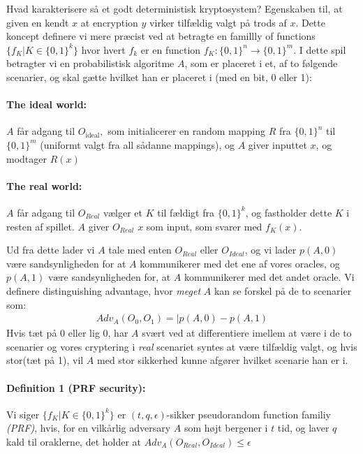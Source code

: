 \documentclass[paper=a4, fontsize=11pt]{scrartcl} %
\numberwithin{equation}{section} %
\numberwithin{figure}{section} %
\numberwithin{table}{section} %
\begin{document}
	Hvad karakterisere så et godt deterministisk kryptosystem? Egenskaben til, at given en kendt $x$ at encryption $y$ virker tilfældig valgt på trods af $x$. Dette koncept definere vi mere præcist ved at betragte en famillly of functions $\{f_K|K\in\{0,1\}^k\}$ hvor hvert $f_k$ er en function $f_K:\{0,1\}^n \rightarrow \{0,1\}^m$. I dette spil betragter vi en probabilistisk algoritme $A$, som er placeret i et, af to følgende scenarier, og skal gætte hvilket han er placeret i (med en bit, 0 eller 1):
	
	\paragraph{\textbf{The ideal world:}} $A$ får adgang til $O_{\text{ideal}},$ som initialicerer en random mapping $R$ fra $\{0,1\}^n$ til $\{0,1\}^m$ (uniformt valgt fra all sådanne mappings), og $A$ giver inputtet $x$, og modtager $R(x)$
	\paragraph{\textbf{The real world:}} $A$ får adgang til $O_{Real}$ vælger et $K$ til fældigt fra $\{0,1\}^k$, og fastholder dette $K$ i resten af spillet. $A$ giver $O_{Real}$ $x$ som input, som svarer med $f_K(x)$.
		
	Ud fra dette lader vi $A$ tale med enten $O_{Real}$ eller $O_{Ideal}$, og vi lader $p(A,0)$ være sandsynligheden for at $A$ kommunikerer med det ene af vores oracles, og $p(A,1)$ være sandsynligheden for, at $A$ kommunikerer	med det andet oracle. Vi definere distinguishing advantage, hvor \textit{meget} $A$ kan se forskel på de to scenarier som:
	\begin{align*}
	Adv_A(O_0,O_1)=|p(A,0)-p(A,1)
	\end{align*}
	Hvis tæt på 0 eller lig 0, har $A$ svært ved at differentiere imellem at være i de to scenarier og vores cryptering i \textit{real} scenariet syntes at være tilfældig valgt, og hvis stor(tæt på 1), vil $A$ med stor sikkerhed kunne afgører hvilket scenarie han er i.
	
	\paragraph{\textbf{Definition 1 (PRF security):}} Vi siger $\{f_K|K\in\{0,1\}^k\}$ er $(t,q,\epsilon)$-sikker pseudorandom function familiy \textit{(PRF)}, hvis, for en vilkårlig adversary $A$ som højt bergener i $t$ tid, og laver $q$ kald til oraklerne, det holder at $Adv_A(O_{Real},O_{Ideal})\leq\epsilon$
		
\end{document}

